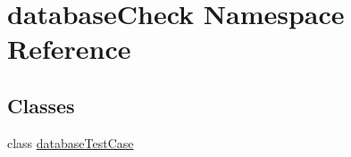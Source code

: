 \hypertarget{namespacedatabaseCheck}{}\section{database\+Check Namespace Reference}
\label{namespacedatabaseCheck}
\subsection*{Classes}
\begin{DoxyCompactItemize}
\item 
class \hyperlink{classdatabaseCheck_1_1databaseTestCase}{database\+Test\+Case}
\end{DoxyCompactItemize}
